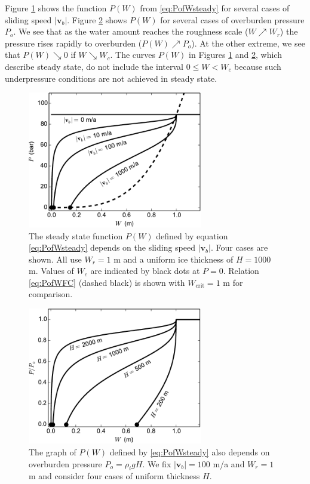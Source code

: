 \documentclass[gmd]{copernicus}   %
\newcommand{\text}{\textrm}
\newcommand\bv{\mathbf{v}}
\begin{document}
\newcommand{\upto}{ \!\!\nearrow\! }
\newcommand{\downto}{ \!\searrow\! }
Figure \ref{fig:psteady-vb} shows the function $P(W)$ from \eqref{eq:PofWsteady} for several cases of sliding speed $|\bv_b|$.  Figure \ref{fig:psteady-Po} shows $P(W)$ for several cases of overburden pressure $P_o$.  We see that as the water amount reaches the roughness scale ($W\upto W_r$) the pressure rises rapidly to overburden ($P(W) \upto P_o$).  At the other extreme, we see that $P(W) \downto 0$ if $W \downto W_c$.  The curves $P(W)$ in Figures \ref{fig:psteady-vb} and \ref{fig:psteady-Po}, which describe steady state, do not include the interval $0\le W < W_c$ because such underpressure conditions are not achieved in steady state.

\begin{figure}[ht]
\includegraphics[width=3.0in,keepaspectratio=true]{psteady-vb}
\caption{The steady state function $P(W)$ defined by equation \eqref{eq:PofWsteady} depends on the sliding speed $|\bv_b|$.  Four cases are shown.  All use $W_r=1$ m and a uniform ice thickness of $H=1000$ m.  Values of $W_c$ are indicated by black dots at $P=0$.  Relation \eqref{eq:PofWFC} (dashed black) is shown with $W_{\text{crit}}=1$ m for comparison.}
\label{fig:psteady-vb}
\end{figure}

\begin{figure}[ht]
\includegraphics[width=3.0in,keepaspectratio=true]{psteady-Po}
\caption{The graph of $P(W)$ defined by \eqref{eq:PofWsteady} also depends on overburden pressure $P_o=\rho_i g H$.  We fix $|\bv_b|=100$ m/a and $W_r=1$ m and consider four cases of uniform thickness $H$.}
\label{fig:psteady-Po}
\end{figure}
\end{document}
